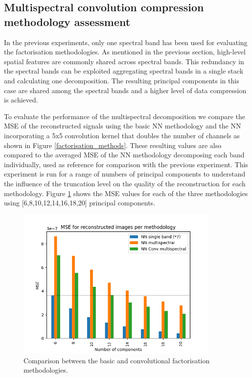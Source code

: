 \documentclass[essd, manuscript]{copernicus}
\begin{document}
\subsection{Multispectral convolution compression methodology assessment}
In the previous experiments, only one spectral band has been used for evaluating the factorisation methodologies. As mentioned in the previous section, high-level spatial features are commonly shared across spectral bands. This redundancy in the spectral bands can be exploited aggregating spectral bands in a single stack and calculating one decomposition. The resulting principal components in this case are shared among the spectral bands and a higher level of data compression is achieved.

To evaluate the performance of the multispectral decomposition we compare the MSE of the reconstructed signals using the basic NN methodology and the NN incorporating a 5x5 convolution kernel that doubles the number of channels as shown in Figure \ref{factorisation_methods}. These resulting values are also compared to the averaged MSE of the NN methodology decomposing each band individually, used as reference for comparison with the previous experiment. This experiment is run for a range of numbers of principal components to understand the influence of the truncation level on the quality of the reconstruction for each methodology. Figure \ref{compression_cmp} shows the MSE values for each of the three methodologies using [6,8,10,12,14,16,18,20] principal components.

\begin{figure}
    \includegraphics[width=10cm]{fig8.png}
    \caption{Comparison between the basic and convolutional factorisation methodologies.}%
    \label{compression_cmp}%
\end{figure}
\end{document}

